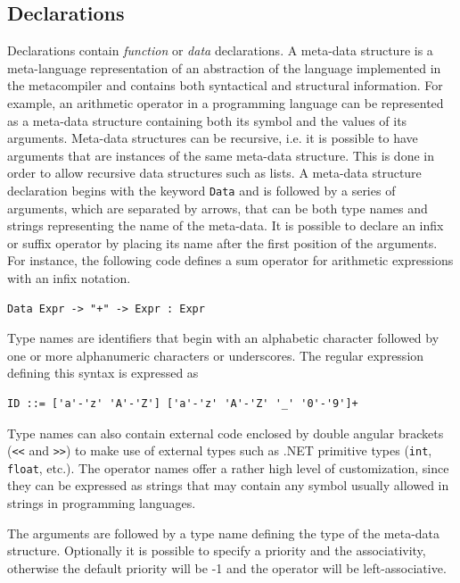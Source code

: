 \subsection{Declarations}
\label{sec:ch_metacasanova_parser_declarations}
Declarations contain \textit{function} or \textit{data} declarations. A meta-data structure is a meta-language representation of an abstraction of the language implemented in the metacompiler and contains both syntactical and structural information. For example, an arithmetic operator in a programming language can be represented as a meta-data structure containing both its symbol and the values of its arguments. Meta-data structures can be recursive, i.e. it is possible to have arguments that are instances of the same meta-data structure. This is done in order to allow recursive data structures such as lists. A meta-data structure declaration begins with the keyword \texttt{Data} and is followed by a series of arguments, which are separated by arrows, that can be both type names and strings representing the name of the meta-data. It is possible to declare an infix or suffix operator by placing its name after the first position of the arguments. For instance, the following code defines a sum operator for arithmetic expressions with an infix notation.

\begin{lstlisting}
Data Expr -> "+" -> Expr : Expr
\end{lstlisting}

Type names are identifiers that begin with an alphabetic character followed by one or more alphanumeric characters or underscores. The regular expression defining this syntax is expressed as

\begin{lstlisting}
ID ::= ['a'-'z' 'A'-'Z'] ['a'-'z' 'A'-'Z' '_' '0'-'9']+
\end{lstlisting}

Type names can also contain external code enclosed by double angular brackets (\texttt{<<} and \texttt{>>}) to make use of external types such as .NET primitive types (\texttt{int}, \texttt{float}, etc.). The operator names offer a rather high level of customization, since they can be expressed as strings that may contain any symbol usually allowed in strings in programming languages.

The arguments are followed by a type name defining the type of the meta-data structure. Optionally it is possible to specify a priority and the associativity, otherwise the default priority will be -1 and the operator will be left-associative.

